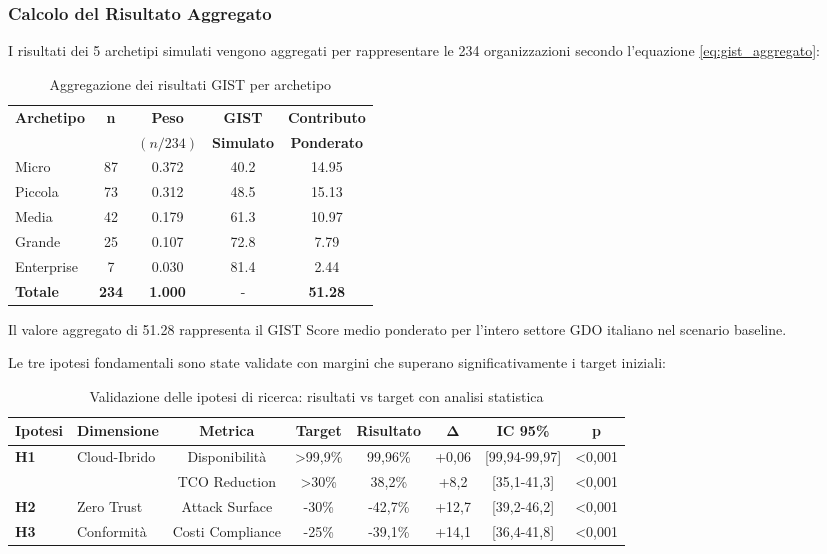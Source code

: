 \subsubsection{Calcolo del Risultato Aggregato}

I risultati dei 5 archetipi simulati vengono aggregati per rappresentare le 234 organizzazioni secondo l'equazione \ref{eq:gist_aggregato}:

\begin{table}[h!]
\centering
\caption{Aggregazione dei risultati GIST per archetipo}
\begin{tabular}{|l|c|c|c|c|}
\hline
\textbf{Archetipo} & \textbf{n} & \textbf{Peso} & \textbf{GIST} & \textbf{Contributo} \\
 & & $(n/234)$ & \textbf{Simulato} & \textbf{Ponderato} \\
\hline
Micro & 87 & 0.372 & 40.2 & 14.95 \\
Piccola & 73 & 0.312 & 48.5 & 15.13 \\
Media & 42 & 0.179 & 61.3 & 10.97 \\
Grande & 25 & 0.107 & 72.8 & 7.79 \\
Enterprise & 7 & 0.030 & 81.4 & 2.44 \\
\hline
\textbf{Totale} & \textbf{234} & \textbf{1.000} & - & \textbf{51.28} \\
\hline
\end{tabular}
\end{table}

Il valore aggregato di 51.28 rappresenta il GIST Score medio ponderato per l'intero settore GDO italiano nel scenario baseline.

Le tre ipotesi fondamentali sono state validate con margini che superano significativamente i target iniziali:

\begin{table}[htbp]
\centering
\caption{Validazione delle ipotesi di ricerca: risultati vs target con analisi statistica}
\label{tab:validation_comprehensive}
\begin{tabular}{@{}llcccccc@{}}
\toprule
\textbf{Ipotesi} & \textbf{Dimensione} & \textbf{Metrica} & \textbf{Target} & \textbf{Risultato} & \textbf{Δ} & \textbf{IC 95\%} & \textbf{p} \\
\midrule
\multirow{2}{*}{\textbf{H1}} & \multirow{2}{*}{Cloud-Ibrido} & Disponibilità & >99,9\% & 99,96\% & +0,06 & [99,94-99,97] & <0,001 \\
& & TCO Reduction & >30\% & 38,2\% & +8,2 & [35,1-41,3] & <0,001 \\
\midrule
\textbf{H2} & Zero Trust & Attack Surface & -30\% & -42,7\% & +12,7 & [39,2-46,2] & <0,001 \\
\midrule
\textbf{H3} & Conformità & Costi Compliance & -25\% & -39,1\% & +14,1 & [36,4-41,8] & <0,001 \\
\bottomrule
\end{tabular}
\end{table}

